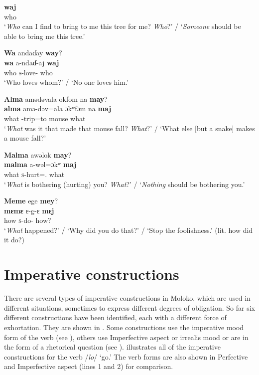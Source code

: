      \medskip
\gll \textbf{waj}\\
     who\\ 
\glt  ‘\textit{Who} can I find to bring to me this tree for me?  \textit{Who}?’ / ‘\textit{Someone} should be able to bring me this tree.’
\z 

\ea \label{ex:10:103}
\textbf{Wa}  andaɗay  \textbf{way}?\\
\gll  \textbf{wa}    a-ndaɗ-aj   \textbf{waj}\\
      who    \textsc{s}-love{}-{\CL}  who\\
\glt  ‘Who loves whom?' / ‘No one loves him.'
\z 

\ea \label{ex:10:104}
\textbf{Alma}  amədəvala  okfom  na  \textbf{may}?\\
\gll  \textbf{alma}  amə-dəv=ala    ɔkʷfɔm  na  \textbf{maj}\\
      what  {\DEP}-trip=to    mouse  {\PSP}  what\\
\glt  ‘\textit{What} was it that made that mouse fall? \textit{What}?' / ‘What else [but a snake] makes a mouse fall?’
\z 

\clearpage
\ea \label{ex:10:105}
\textbf{Malma}  awəlok{  }\textbf{may}?\\
\gll  \textbf{malma}   a-wəl=ɔkʷ   \textbf{maj}\\
      what  \textsc{s}-hurt={\twoS}.{\IO}  what\\
\glt  ‘\textit{What} is bothering (hurting) you? \textit{What}?’ / ‘\textit{Nothing} should be bothering you.’
\z 

\ea \label{ex:10:106}
\textbf{Meme}  ege  \textbf{mey}?\\
\gll  \textbf{mɛmɛ}   ɛ{}-g-ɛ     \textbf{mɛj}\\
      how    \textsc{s}-do-{\CL}  how?\\
\glt  ‘\textit{What} happened?’ / ‘Why did you do that?’ / ‘Stop the foolishness.’ (lit. how did it do?)
\z 

\section{Imperative constructions}\label{sec:10.4}
\hypertarget{RefHeading1213101525720847}{}
There are several types of imperative constructions in Moloko, which are used in different situations, sometimes to express different degrees of obligation.  So far six different constructions have been identified, each with a different force of exhortation. They are shown in . Some constructions use the imperative mood form of the verb (see ), others use Imperfective aspect or irrealis mood or are in the form of a rhetorical question (see ).  illustrates all of the imperative constructions for the verb /\textit{lo}/ ‘go.’ The verb forms are also shown in Perfective and Imperfective aspect (lines 1 and 2) for comparison.


